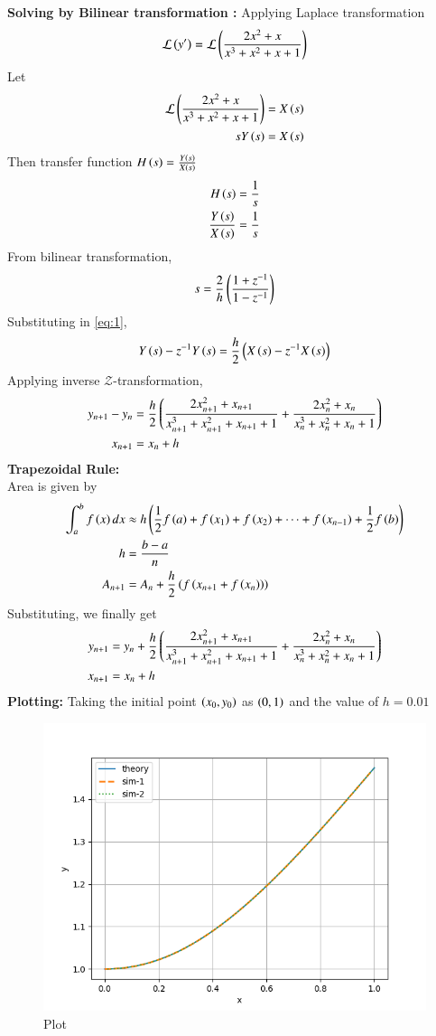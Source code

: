 \documentclass[journal]{IEEEtran}
\begin{document}
\textbf{Solving by Bilinear transformation :}
Applying Laplace transformation
\begin{align}
\mathcal{L}\left(y^\prime\right)=\mathcal{L}\left(\frac{2x^2+x}{x^3+x^2+x+1}\right)\\
\end{align}
Let 
\begin{align}
\mathcal{L}\left(\frac{2x^2+x}{x^3+x^2+x+1}\right)&=X\left(s\right)\\
sY\left(s\right)&=X\left(s\right)
\end{align}
Then transfer function $H\left(s\right)=\frac{Y\left(s\right)}{X\left(s\right)}$
\begin{align}
H\left(s\right)=\frac{1}{s}\\
\frac{Y\left(s\right)}{X\left(s\right)}=\frac{1}{s}\label{eq:1}
\end{align}
From bilinear transformation,
\begin{align}
s=\frac{2}{h}\left(\frac{1+z^{-1}}{1-z^{-1}}\right)
\end{align}
Substituting in \eqref{eq:1},
\begin{align}
Y\left(s\right)-z^{-1}Y\left(s\right)=\frac{h}{2}\left(X\left(s\right)-z^{-1}X\left(s\right)\right)
\end{align}
Applying inverse $\mathcal{Z}$-transformation,
\begin{align}
y_{n+1}-y_n&=\frac{h}{2}\left(\frac{2x_{n+1}^2+x_{n+1}}{x_{n+1}^3+x_{n+1}^2+x_{n+1}+1}+\frac{2x_{n}^2+x_{n}}{x_{n}^3+x_{n}^2+x_{n}+1}\right)\\
x_{n+1}&=x_n+h
\end{align}
\textbf{Trapezoidal Rule:}\\
Area is given by
\begin{align}
\int_a^{b} f\left(x\right)dx&\approx h\left(\frac{1}{2}f\left(a\right)+f\left(x_1\right)+f\left(x_2\right)+\dots +f\left(x_{n-1}\right)+\frac{1}{2}f\left(b\right)\right)\\
h&=\frac{b-a}{n}\\
A_{n+1}&=A_n+\frac{h}{2}\left(f\left(x_{n+1}+f\left(x_n\right)\right)\right)
\end{align}
Substituting, we finally get
\begin{align}
y_{n+1}&=y_n+\frac{h}{2}\left(\frac{2x_{n+1}^2+x_{n+1}}{x_{n+1}^3+x_{n+1}^2+x_{n+1}+1}+\frac{2x_{n}^2+x_{n}}{x_{n}^3+x_{n}^2+x_{n}+1}\right)\\
x_{n+1}&=x_n+h
\end{align}
\textbf{Plotting:}
Taking the initial point $\left(x_0,y_0\right)$ as $\left(0,1\right)$ and the value of $h=0.01$
\begin{figure}[h!]
   \centering
   \includegraphics[width=1\columnwidth]{Figs/Figure_1.png}
   \caption{Plot}
\end{figure}
\end{document}
